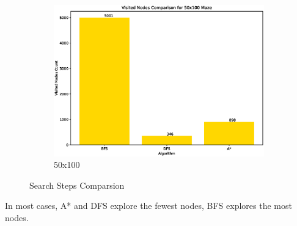 \documentclass{article}
\begin{document}
\begin{figure}[htbp]
\begin{subfigure}[b]{0.45\textwidth}
        \includegraphics[width=\textwidth]{imgs/Visited-50-100.eps}
        \caption{50x100}
    \end{subfigure}
    \caption{Search Steps Comparsion}
\end{figure}
In most cases, A* and DFS explore the fewest nodes, BFS explores the most nodes.
\end{document}
